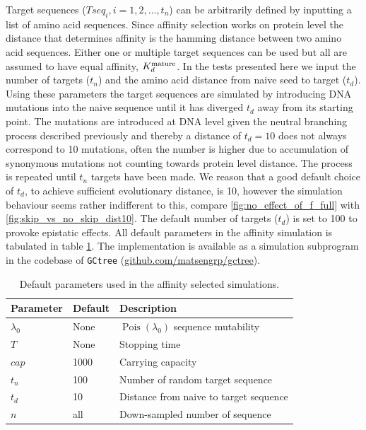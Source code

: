 Target sequences ($Tseq_i, i=1,2, \hdots, t_n$) can be arbitrarily defined by inputting a list of amino acid sequences.
Since affinity selection works on protein level the distance that determines affinity is the hamming distance between two amino acid sequences.
Either one or multiple target sequences can be used but all are assumed to have equal affinity, $K^{\text{mature}}_d$.
In the tests presented here we input the number of targets ($t_n$) and the amino acid distance from naive seed to target ($t_d$).
Using these parameters the target sequences are simulated by introducing DNA mutations into the naive sequence until it has diverged $t_d$ away from its starting point.
The mutations are introduced at DNA level given the neutral branching process described previously and thereby a distance of $t_d=10$ does not always correspond to 10 mutations, often the number is higher due to accumulation of synonymous mutations not counting towards protein level distance.
The process is repeated until $t_n$ targets have been made.
We reason that a good default choice of $t_d$, to achieve sufficient evolutionary distance, is 10, however the simulation behaviour seems rather indifferent to this, compare \ref{fig:no_effect_of_f_full} with \ref{fig:skip_vs_no_skip_dist10}.
The default number of targets ($t_d$) is set to 100 to provoke epistatic effects.
All default parameters in the affinity simulation is tabulated in table \ref{aff_constants}.
The implementation is available as a simulation subprogram in the codebase of \texttt{GCtree} (\url{github.com/matsengrp/gctree}).

\begin{table}[ht]
\centering
\begin{tabular}{lll}
Parameter    & Default & Description \\ \hline
$\lambda_0$ & None & $\operatorname{Pois}(\lambda_0)$ sequence mutability \\
$T$ & None & Stopping time \\
$cap$ & 1000 & Carrying capacity \\
$t_n$ & 100 & Number of random target sequence \\
$t_d$ & 10 & Distance from naive to target sequence \\
$n$ & all & Down-sampled number of sequence
\end{tabular}
\caption{
\label{aff_constants}
    Default parameters used in the affinity selected simulations.}
\end{table}











